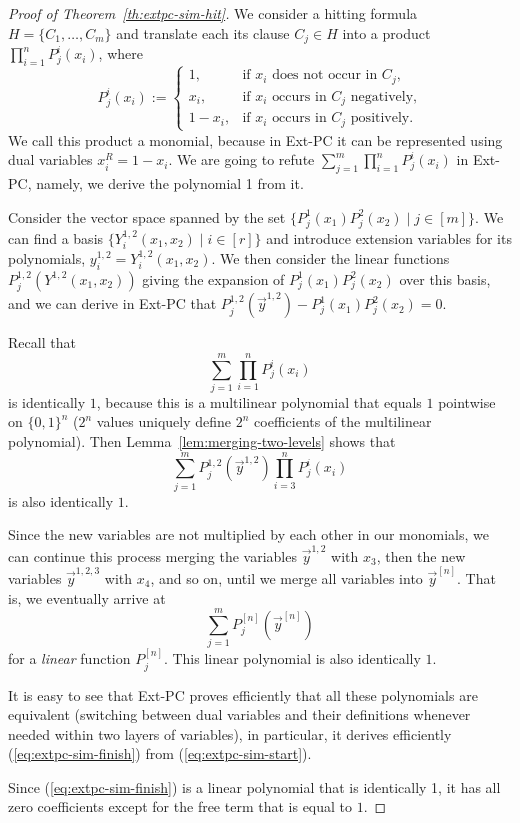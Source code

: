 \documentclass[11pt]{article}
\newcommand{\scterm}[1]{{\textrm{\sc #1}}}
\newcommand{\extpc}{\scterm{Ext-PC}}
\numberwithin{equation}{section}
\begin{document}
\begin{proof}[Proof of Theorem~\ref{th:extpc-sim-hit}]
We consider a hitting formula $H=\{C_1,\dotsc,C_m\}$
and translate each its clause $C_j\in H$
into a product $\prod_{i=1}^n P^i_j(x_i)$,
where 
\[
P^i_j(x_i) := 
\begin{cases}
1,    &\textrm{if $x_i$ does not occur in $C_j$,}\\
x_i,  &\textrm{if $x_i$ occurs in $C_j$ negatively,}\\
1-x_i,&\textrm{if $x_i$ occurs in $C_j$ positively.}
\end{cases}
\]
We call this product a monomial, because in {\extpc}
it can be represented using dual variables $x_i^R=1-x_i$.
We are going to refute $\sum_{j=1}^m \prod_{i=1}^n P^i_j(x_i)$ in {\extpc},
namely, we derive the polynomial 1 from it.

Consider the vector space spanned by the set $\{P^1_j(x_1) P^2_j(x_2) \mid j\in[m]\}$.
We can find a basis $\{Y^{1,2}_i(x_1,x_2) \mid i\in[r]\}$
and introduce extension variables for its polynomials,
$y^{1,2}_i=Y^{1,2}_i(x_1,x_2)$.
We then consider the linear functions $P^{1,2}_j(Y^{1,2}(x_1,x_2))$ giving 
the expansion of $P^1_j(x_1) P^2_j(x_2)$
over this basis, and we can derive in {\extpc} that
$P^{1,2}_j(\vec y^{1,2})-P^1_j(x_1) P^2_j(x_2)=0$.

Recall that 
\begin{equation}\label{eq:extpc-sim-start}
\sum_{j=1}^m \prod_{i=1}^n P^i_j(x_i)
\end{equation}
is identically $1$,
because this is a multilinear polynomial that equals $1$ pointwise on $\{0,1\}^n$
($2^n$ values uniquely define $2^n$ coefficients of the multilinear polynomial).
Then Lemma~\ref{lem:merging-two-levels} shows that
\begin{equation}\label{eq:extpc-sim-onelevel}
\sum_{j=1}^m P^{1,2}_j(\vec y^{1,2})\prod_{i=3}^n P^i_j(x_i)
\end{equation} 
is also identically $1$.

Since the new variables are not multiplied by each other in our monomials,
we can continue this process merging the variables $\vec y^{1,2}$ with $x_3$,
then the new variables $\vec y^{1,2,3}$ with $x_4$, and so on,
until we merge all variables into $\vec y^{[n]}$.
That is, we eventually arrive at 
\begin{equation}\label{eq:extpc-sim-finish}
\sum_{j=1}^m P^{[n]}_j(\vec y^{[n]})
\end{equation}
for a \emph{linear} function $P^{[n]}_j$.
This linear polynomial is also identically $1$.

It is easy to see that {\extpc} proves efficiently that all these polynomials
are equivalent (switching between dual variables and their definitions whenever needed
within two layers of variables), 
in particular, it derives efficiently (\ref{eq:extpc-sim-finish})
from (\ref{eq:extpc-sim-start}).

Since (\ref{eq:extpc-sim-finish}) is a linear polynomial that is identically 1,
it has all zero coefficients except for the free term that is equal to $1$.
\end{proof}
\end{document}
